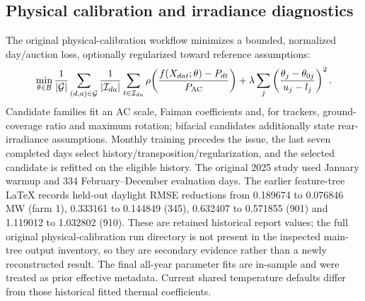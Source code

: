 \subsection{Physical calibration and irradiance diagnostics}
The original physical-calibration workflow minimizes a bounded, normalized
day/auction loss, optionally regularized toward reference assumptions:
\begin{equation}
 \min_{\theta\in\mathcal B}
 \frac1{|\mathcal G|}\sum_{(d,a)\in\mathcal G}\frac1{|\mathcal I_{da}|}
 \sum_{t\in\mathcal I_{da}}\rho\!\left(
 \frac{f(X_{dat};\theta)-P_{dt}}{P_{\rm AC}}\right)
 +\lambda\sum_j\left(\frac{\theta_j-\theta_{0j}}{u_j-l_j}\right)^2.
\end{equation}
Candidate families fit an AC scale, Faiman coefficients and, for trackers,
ground-coverage ratio and maximum rotation; bifacial candidates additionally
state rear-irradiance assumptions. Monthly training precedes the issue, the
last seven completed days select history/transposition/regularization, and
the selected candidate is refitted on the eligible history. The original
2025 study used January warmup and 334 February--December evaluation days.
The earlier feature-tree LaTeX records held-out daylight RMSE reductions from
0.189674 to 0.076846 MW (farm 1), 0.333161 to 0.144849 (345), 0.632407 to
0.571855 (901) and 1.119012 to 1.032802 (910). These are retained historical
report values; the full original physical-calibration run directory is not
present in the inspected main-tree output inventory, so they are secondary
evidence rather than a newly reconstructed result. The final all-year parameter
fits are in-sample and were treated as prior effective metadata. Current shared
temperature defaults differ from those historical fitted thermal coefficients.


